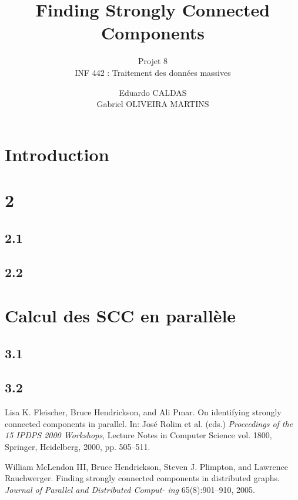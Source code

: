 \documentclass[a4paper,12pt,twoside]{article}
\title[Finding Strongly Connected Components INF442]{Finding Strongly Connected Components}
\subtitle{Projet 8 \\ INF 442 : Traitement des données massives}
\author{Eduardo CALDAS \\ Gabriel OLIVEIRA MARTINS}
\begin{document}
\maketitle

\tableofcontents

\newpage

\section{Introduction}
 

\newpage
\section{2}

\subsection{2.1}


\subsection{2.2}

\newpage
\section{Calcul des SCC en parallèle}

\subsection{3.1}

\subsection{3.2}

\newpage
\begin{thebibliography}{9}
Lisa K. Fleischer, Bruce Hendrickson, and Ali Pınar.
On identifying strongly connected components
in parallel. In: José Rolim et al. (eds.)
\textit{Proceedings of the 15 IPDPS 2000 Workshops}, Lecture Notes
in Computer Science vol. 1800, Springer, Heidelberg, 2000, pp. 505–511.
 
William McLendon III, Bruce Hendrickson, Steven J. Plimpton, and Lawrence Rauchwerger. Finding
strongly connected components in distributed graphs. \textit{Journal of Parallel and Distributed Comput-
ing} 65(8):901–910, 2005.

\end{thebibliography}
\end{document}
